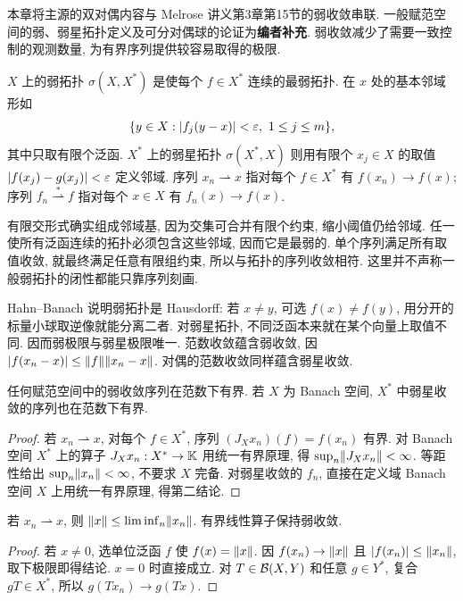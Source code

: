 \label{ch:weak}
本章将主源的双对偶内容与 Melrose 讲义第3章第15节的弱收敛串联. 一般赋范空间的弱、弱星拓扑定义及可分对偶球的论证为\textbf{编者补充}. 弱收敛减少了需要一致控制的观测数量, 为有界序列提供较容易取得的极限.

\begin{definition}
$X$ 上的弱拓扑 $\sigma(X,X^*)$ 是使每个 $f\in X^*$ 连续的最弱拓扑. 在 $x$ 处的基本邻域形如
\[
\{y\in X:|f_j(y-x)|<\varepsilon,\ 1\le j\le m\},
\]
其中只取有限个泛函. $X^*$ 上的弱星拓扑 $\sigma(X^*,X)$ 则用有限个 $x_j\in X$ 的取值 $|f(x_j)-g(x_j)|<\varepsilon$ 定义邻域. 序列 $x_n\rightharpoonup x$ 指对每个 $f\in X^*$ 有 $f(x_n)\to f(x)$; 序列 $f_n\overset{*}{\rightharpoonup}f$ 指对每个 $x\in X$ 有 $f_n(x)\to f(x)$.
\end{definition}
有限交形式确实组成邻域基, 因为交集可合并有限个约束, 缩小阈值仍给邻域. 任一使所有泛函连续的拓扑必须包含这些邻域, 因而它是最弱的. 单个序列满足所有取值收敛, 就最终满足任意有限组约束, 所以与拓扑的序列收敛相符. 这里并不声称一般弱拓扑的闭性都能只靠序列刻画.

Hahn--Banach 说明弱拓扑是 Hausdorff: 若 $x\ne y$, 可选 $f(x)\ne f(y)$, 用分开的标量小球取逆像就能分离二者. 对弱星拓扑, 不同泛函本来就在某个向量上取值不同. 因而弱极限与弱星极限唯一. 范数收敛蕴含弱收敛, 因 $|f(x_n-x)|\le\lVert f\rVert\lVert x_n-x\rVert$. 对偶的范数收敛同样蕴含弱星收敛.

\begin{proposition}\label{prop:weakbounded}
任何赋范空间中的弱收敛序列在范数下有界. 若 $X$ 为 Banach 空间, $X^*$ 中弱星收敛的序列也在范数下有界.
\end{proposition}
\begin{proof}
若 $x_n\rightharpoonup x$, 对每个 $f\in X^*$, 序列 $(J_Xx_n)(f)=f(x_n)$ 有界. 对 Banach 空间 $X^*$ 上的算子 $J_Xx_n:X^*\to\mathbb K$ 用统一有界原理, 得 $\sup_n\lVert J_Xx_n\rVert<\infty$. 等距性给出 $\sup_n\lVert x_n\rVert<\infty$, 不要求 $X$ 完备. 对弱星收敛的 $f_n$, 直接在定义域 Banach 空间 $X$ 上用统一有界原理, 得第二结论.
\end{proof}

\begin{proposition}\label{prop:weaklsc}
若 $x_n\rightharpoonup x$, 则 $\lVert x\rVert\le\liminf_n\lVert x_n\rVert$. 有界线性算子保持弱收敛.
\end{proposition}
\begin{proof}
若 $x\ne0$, 选单位泛函 $f$ 使 $f(x)=\lVert x\rVert$. 因 $f(x_n)\to\lVert x\rVert$ 且 $|f(x_n)|\le\lVert x_n\rVert$, 取下极限即得结论. $x=0$ 时直接成立. 对 $T\in\mathcal B(X,Y)$ 和任意 $g\in Y^*$, 复合 $gT\in X^*$, 所以 $g(Tx_n)\to g(Tx)$.
\end{proof}


